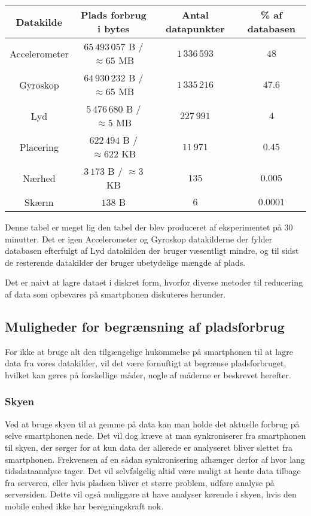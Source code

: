 \begin{tabular}{|c|c|c|c|}
	\hline Datakilde	 & Plads forbrug i bytes	  			& Antal datapunkter 	& \% af databasen \\
	\hline Accelerometer & $65\,493\,057$ B / $\approx65$ MB   	& $1\,336\,593$    		& $48$ \\ 
	\hline Gyroskop 	 & $64\,930\,232$ B / $\approx65$ MB  	& $1\,335\,216$   		& $47.6$ \\ 
	\hline Lyd 		  	 & $5\,476\,680$ B / $\approx5$  MB  	& $227\,991$     		& $4$ \\ 
	\hline Placering 	 & $622\,494$ B	/ $\approx622$ KB		& $11\,971$      		& $0.45$ \\ 
	\hline Nærhed    	 & $3\,173$ B	/ $\approx3$ KB			& $135$ 				& $0.005$ \\ 
	\hline Skærm 		 & $138$ B          					& $6$          			& $0.0001$ \\ 
	\hline 
\end{tabular} 

Denne tabel er meget lig den tabel der blev produceret af eksperimentet på 30 minutter.
Det er igen Accelerometer og Gyroskop datakilderne der fylder databasen efterfulgt af Lyd datakilden der bruger væsentligt mindre, og til sidst de resterende datakilder der bruger ubetydelige mængde af plads.

Det er naivt at lagre dataet i diskret form, hvorfor diverse metoder til reducering af data som opbevares på smartphonen diskuteres herunder.

\subsection{Muligheder for begrænsning af pladsforbrug}
For ikke at bruge alt den tilgængelige hukommelse på smartphonen til at lagre data fra vores datakilder, vil det være fornuftigt at begrænse pladsforbruget, hvilket kan gøres på forskellige måder, nogle af måderne er beskrevet herefter.

\subsubsection{Skyen}
Ved at bruge skyen til at gemme på data kan man holde det aktuelle forbrug på selve smartphonen nede.
Det vil dog kræve at man synkroniserer fra smartphonen til skyen, der sørger for at kun data der allerede er analyseret bliver slettet fra smartphonen. 
Frekvensen af en sådan synkronisering afhænger derfor af hvor lang tidsdataanalyse tager.
Det vil selvfølgelig altid være muligt at hente data tilbage fra serveren, eller hvis pladsen bliver et større problem, udføre analyse på serversiden.
Dette vil også muliggøre at have analyser kørende i skyen, hvis den mobile enhed ikke har beregningskraft nok.

